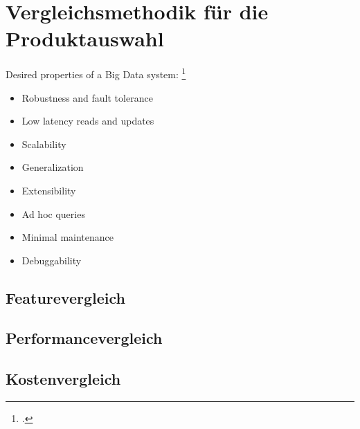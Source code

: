 \section{Vergleichsmethodik für die Produktauswahl}\label{chap:vergleichsmethodik}

Desired properties of a Big Data system: \footcite[Vgl.][]{Marz.2015}
\begin{itemize}
\item Robustness and fault tolerance
\item Low latency reads and updates
\item Scalability
\item Generalization
\item Extensibility
\item Ad hoc queries
\item Minimal maintenance
\item Debuggability
\end{itemize}


\subsection{Featurevergleich}

\subsection{Performancevergleich}

\subsection{Kostenvergleich}
